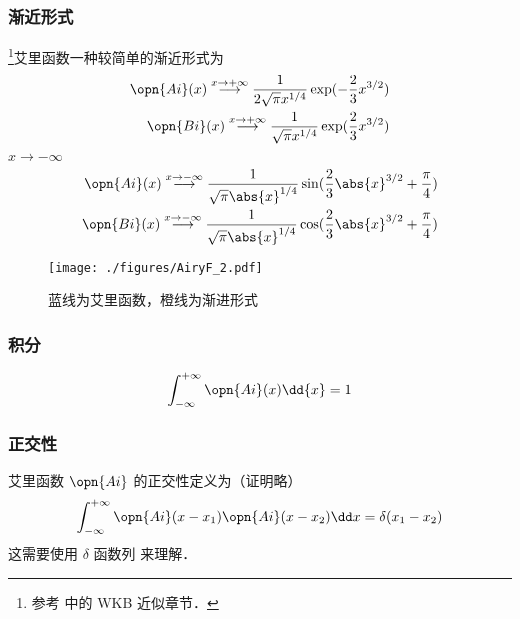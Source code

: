 \subsubsection{渐近形式}
\footnote{参考 \cite{GriffQ} 中的 WKB 近似章节．}艾里函数一种较简单的渐近形式为
\begin{align}
\opn{Ai}(x) \overset{x \to +\infty}{\longrightarrow} \frac{1}{2\sqrt{\pi} x^{1/4}} \exp(-\frac{2}{3}x^{3/2})\\
\opn{Bi}(x) \overset{x \to +\infty}{\longrightarrow} \frac{1}{\sqrt{\pi} x^{1/4}} \exp(\frac{2}{3}x^{3/2})
\end{align}
$x \to -\infty$
\begin{align}
\opn{Ai}(x) \overset{x \to -\infty}{\longrightarrow} \frac{1}{\sqrt{\pi} \abs{x}^{1/4}} \sin(\frac{2}{3}\abs{x}^{3/2}+\frac{\pi}{4})\\
\opn{Bi}(x) \overset{x \to -\infty}{\longrightarrow} \frac{1}{\sqrt{\pi} \abs{x}^{1/4}} \cos(\frac{2}{3}\abs{x}^{3/2}+\frac{\pi}{4})
\end{align}
\begin{figure}[ht]
\centering
\texttt{[image: ./figures/AiryF\_2.pdf]}
\caption{蓝线为艾里函数，橙线为渐进形式} \label{AiryF_fig2}
\end{figure}

\subsubsection{积分}
\begin{equation}
\int_{-\infty}^{+\infty} \opn{Ai}(x) \dd{x} = 1
\end{equation}

\subsubsection{正交性}
艾里函数 $\opn{Ai}$ 的正交性定义为（证明略）
\begin{equation}
\int_{-\infty}^{+\infty} \opn{Ai}(x-x_1)\opn{Ai}(x-x_2)\dd x=\delta(x_1-x_2)
\end{equation}
这需要使用 $\delta$ 函数列 来理解．

